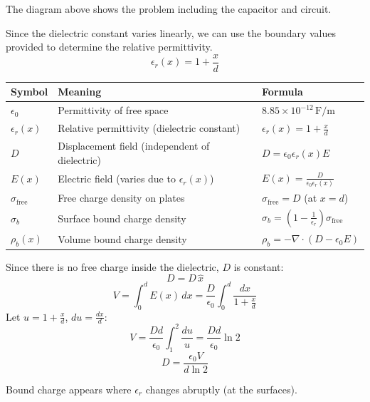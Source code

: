 \documentclass[a4paper]{article}
\begin{document}
\begin{tcolorbox}[
    title=Solution,
    colback=white,
    colframe=myblue,
    coltitle=black,
    fonttitle=\bfseries\large,
    breakable,
    enhanced,
    attach boxed title to top center={yshift=-2mm},
    boxed title style={colback=myblue!20, colframe=myblue}
]
The diagram above shows the problem including the capacitor and circuit.

Since the dielectric constant varies linearly, we can use the boundary values provided to determine the relative permittivity.
\[
\epsilon_r(x) = 1 + \frac{x}{d} 
\]

\begin{center}
\begin{tabular}{|l|l|l|}
    \hline
    \textbf{Symbol} & \textbf{Meaning} & \textbf{Formula} \\
    \hline
    \( \epsilon_0 \) & Permittivity of free space & \( 8.85 \times 10^{-12} \, \text{F/m} \) \\
    \( \epsilon_r(x) \) & Relative permittivity (dielectric constant) & \( \epsilon_r(x) = 1 + \frac{x}{d} \) \\
    \( D \) & Displacement field (independent of dielectric) & \( D = \epsilon_0 \epsilon_r(x) E \) \\
    \( E(x) \) & Electric field (varies due to \( \epsilon_r(x) \)) & \( E(x) = \frac{D}{\epsilon_0 \epsilon_r(x)} \) \\
    \( \sigma_{\text{free}} \) & Free charge density on plates & \( \sigma_{\text{free}} = D \) (at \( x = d \)) \\
    \( \sigma_b \) & Surface bound charge density & \( \sigma_b = \left(1 - \frac{1}{\epsilon_r}\right) \sigma_{\text{free}} \) \\
    \( \rho_b(x) \) & Volume bound charge density & \( \rho_b = -\nabla \cdot (D - \epsilon_0 E) \) \\
    \hline
\end{tabular}
\end{center}

Since there is no free charge inside the dielectric, \( D \) is constant:
\[
D = D \, \hat{x}
\]
\[
V = \int_0^d E(x) \, dx = \frac{D}{\epsilon_0} \int_0^d \frac{dx}{1 + \frac{x}{d}}
\]
Let \( u = 1 + \frac{x}{d} \), \( du = \frac{dx}{d} \):
\[
V = \frac{D d}{\epsilon_0} \int_1^2 \frac{du}{u} = \frac{D d}{\epsilon_0} \ln 2
\]
\[
\boxed{D = \frac{\epsilon_0 V}{d \ln 2}}
\]

Bound charge appears where \( \epsilon_r \) changes abruptly (at the surfaces).


\end{tcolorbox}
\end{document}
